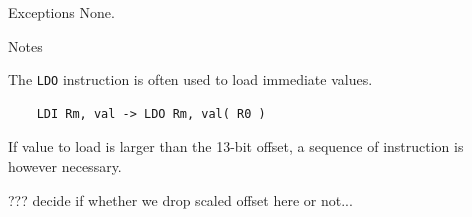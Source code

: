 \begin{iPageDescEntry}{Exceptions}
None.
\end{iPageDescEntry}

\begin{iPageDescEntry}{Notes}

The \texttt{LDO} instruction is often used to load immediate values. 

\begin{verbatim}
    LDI Rm, val -> LDO Rm, val( R0 )
\end{verbatim}

If value to load is larger than the 13-bit offset, a sequence of instruction is however necessary.

??? decide if whether we drop scaled offset here or not...


\end{iPageDescEntry}



